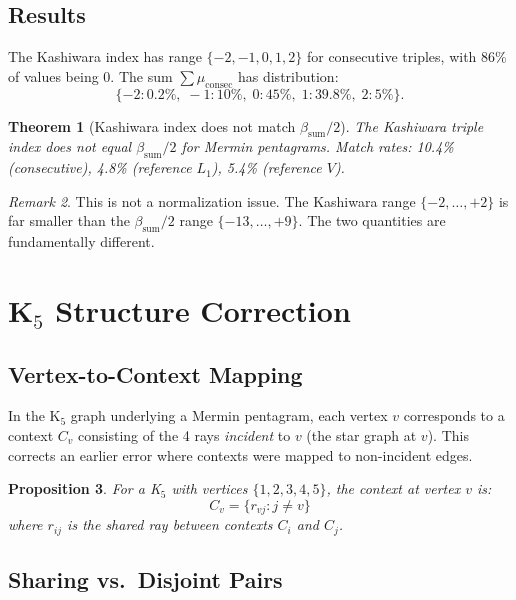 \documentclass[11pt,a4paper]{article}
\newtheorem{theorem}{Theorem}[section]
\newtheorem{proposition}[theorem]{Proposition}
\theoremstyle{remark}
\newtheorem{remark}[theorem]{Remark}
\begin{document}
\subsection{Results}

The Kashiwara index has range $\{-2, -1, 0, 1, 2\}$ for consecutive triples, with 86\% of values being 0.
The sum $\sum \mu_{\mathrm{consec}}$ has distribution:
\[
  \{-2: 0.2\%,\; -1: 10\%,\; 0: 45\%,\; 1: 39.8\%,\; 2: 5\%\}.
\]

\begin{theorem}[Kashiwara index does not match $\beta_{\mathrm{sum}}/2$]\label{thm:kashiwara-fails}
The Kashiwara triple index does not equal $\beta_{\mathrm{sum}}/2$ for Mermin pentagrams.
Match rates: 10.4\% (consecutive), 4.8\% (reference $L_1$), 5.4\% (reference $V$).
\end{theorem}

\begin{remark}
This is not a normalization issue. The Kashiwara range $\{-2,\ldots,+2\}$ is far smaller than the $\beta_{\mathrm{sum}}/2$ range $\{-13,\ldots,+9\}$.
The two quantities are fundamentally different.
\end{remark}


\section{\texorpdfstring{K$_5$}{K5} Structure Correction}\label{sec:k5}

\subsection{Vertex-to-Context Mapping}

In the K$_5$ graph underlying a Mermin pentagram, each vertex $v$ corresponds to a context $C_v$ consisting of the 4 rays \emph{incident} to $v$ (the star graph at $v$).
This corrects an earlier error where contexts were mapped to non-incident edges.

\begin{proposition}\label{prop:star}
For a K$_5$ with vertices $\{1,2,3,4,5\}$, the context at vertex $v$ is:
\[
  C_v = \{r_{vj} : j \neq v\}
\]
where $r_{ij}$ is the shared ray between contexts $C_i$ and $C_j$.
\end{proposition}

\subsection{Sharing vs.\ Disjoint Pairs}
\end{document}
